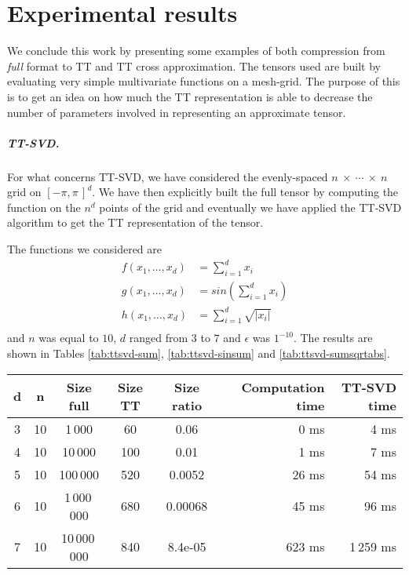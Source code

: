 \chapter{Experimental results}
We conclude this work by presenting some examples of both compression from \emph{full} format to TT and TT cross approximation. The tensors used are built by evaluating very simple multivariate functions on a mesh-grid. The purpose of this is to get an idea on how much the TT representation is able to decrease the number of parameters involved in representing an approximate tensor.

\paragraph{TT-SVD.}
For what concerns TT-SVD, we have considered the evenly-spaced $n~\times~\cdots~\times~n$ grid on $[-\pi,\pi\,]^d$. We have then explicitly built the full tensor by computing the function on the $n^d$ points of the grid and eventually we have applied the TT-SVD algorithm to get the TT representation of the tensor.

The functions we considered are
\begin{align*}
  f(x_1,\ldots,x_d) &= \sum_{i=1}^{d} x_i\\
  g(x_1,\ldots,x_d) &= sin(\sum_{i=1}^{d} x_i)\\
  h(x_1,\ldots,x_d) &= \sum_{i=1}^{d} \sqrt{|x_i|}\\
\end{align*}
and $n$ was equal to $10$, $d$ ranged from $3$ to $7$ and $\epsilon$ was $1^{-10}$.
The results are shown in Tables \ref{tab:ttsvd-sum}, \ref{tab:ttsvd-sinsum} and \ref{tab:ttsvd-sumsqrtabs}.

\begin{center}
  \begin{tabular}[ht]{cccccrr}
    \toprule
    d & n  & Size full & Size TT & Size ratio & Computation time & TT-SVD time\\ \midrule
    3 & 10 & 1\,000     & 60     & 0.06      & 0 ms & 4 ms\\
    4 & 10 & 10\,000    & 100    & 0.01      & 1 ms & 7 ms\\
    5 & 10 & 100\,000   & 520    & 0.0052    & 26 ms & 54 ms\\
    6 & 10 & 1\,000\,000  & 680    & 0.00068   & 45 ms & 96 ms\\ 
    7 & 10 & 10\,000\,000 &840&8.4e-05& 623 ms & 1\,259 ms\\ \bottomrule
  \end{tabular}
\end{center}

